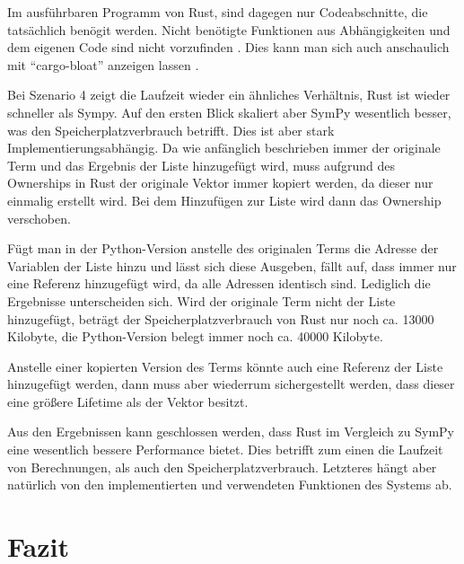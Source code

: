 \documentclass[11pt,a4paper, ngerman]{article}
\begin{document}
Im ausführbaren Programm von Rust, sind dagegen nur Codeabschnitte, die tatsächlich benögit werden. Nicht benötigte Funktionen aus Abhängigkeiten und dem eigenen Code sind nicht vorzufinden \cite{RustDeadCode1}. Dies kann man sich auch anschaulich mit ``cargo-bloat'' anzeigen lassen \cite{RustDeadCode2}.

Bei Szenario 4 zeigt die Laufzeit wieder ein ähnliches Verhältnis, Rust ist wieder schneller als Sympy. Auf den ersten Blick skaliert aber SymPy wesentlich besser, was den Speicherplatzverbrauch betrifft. Dies ist aber stark Implementierungsabhängig. Da wie anfänglich beschrieben immer der originale Term und das Ergebnis der Liste hinzugefügt wird, muss aufgrund des Ownerships in Rust der originale Vektor immer kopiert werden, da dieser nur einmalig erstellt wird. Bei dem Hinzufügen zur Liste wird dann das Ownership verschoben.

Fügt man in der Python-Version anstelle des originalen Terms die Adresse der Variablen der Liste hinzu und lässt sich diese Ausgeben, fällt auf, dass immer nur eine Referenz hinzugefügt wird, da alle Adressen identisch sind. Lediglich die Ergebnisse unterscheiden sich. Wird der originale Term nicht der Liste hinzugefügt, beträgt der Speicherplatzverbrauch von Rust nur noch ca. 13000 Kilobyte, die Python-Version belegt immer noch ca. 40000 Kilobyte.

Anstelle einer kopierten Version des Terms könnte auch eine Referenz der Liste hinzugefügt werden, dann muss aber wiederrum sichergestellt werden, dass dieser eine größere Lifetime als der Vektor besitzt.

Aus den Ergebnissen kann geschlossen werden, dass Rust im Vergleich zu SymPy eine wesentlich bessere Performance bietet. Dies betrifft zum einen die Laufzeit von Berechnungen, als auch den Speicherplatzverbrauch. Letzteres hängt aber natürlich von den implementierten und verwendeten Funktionen des Systems ab.

\newpage

\section{Fazit}
\end{document}
